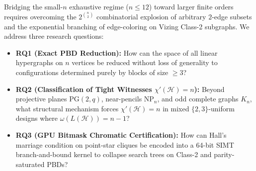 \documentclass[11pt,reqno]{amsart}
\theoremstyle{definition}
\theoremstyle{remark}
\begin{document}
Bridging the small-$n$ exhaustive regime ($n \le 12$) toward larger finite orders requires overcoming the $2^{\binom{n}{2}}$ combinatorial explosion of arbitrary $2$-edge subsets and the exponential branching of edge-coloring on Vizing Class-2 subgraphs. We address three research questions:
\begin{itemize}
  \item \textbf{RQ1 (Exact PBD Reduction):} How can the space of all linear hypergraphs on $n$ vertices be reduced without loss of generality to configurations determined purely by blocks of size $\ge 3$?
  \item \textbf{RQ2 (Classification of Tight Witnesses $\chi'(\mathcal{H}) = n$):} Beyond projective planes $\mathrm{PG}(2, q)$, near-pencils $\mathrm{NP}_n$, and odd complete graphs $K_n$, what structural mechanism forces $\chi'(\mathcal{H}) = n$ in mixed $\{2, 3\}$-uniform designs where $\omega(L(\mathcal{H})) = n - 1$?
  \item \textbf{RQ3 (GPU Bitmask Chromatic Certification):} How can Hall's marriage condition on point-star cliques be encoded into a 64-bit SIMT branch-and-bound kernel to collapse search trees on Class-2 and parity-saturated PBDs?
\end{itemize}
\end{document}
